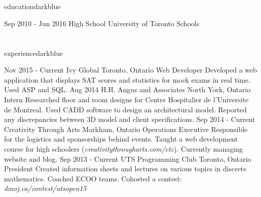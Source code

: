 \documentclass{resume}
\begin{document}
	\begin{main}
		\vspace{10pt}%
		\section{\faBook}{education}{darkblue}
			\begin{entrylist}
				\rightentry%
				{Sep 2010 - Jun 2016}%
				{High School}%
				{University of Toronto Schools}%
				{}{}
			\end{entrylist}
		\section{\faBriefcase}{experience}{darkblue}
			\begin{entrylist}
				\rightentry%
					{Nov 2015 - Current}%
					{Ivy Global}%
					{Toronto, Ontario}%
					{Web Developer}%
					{Developed a web application that displays SAT scores and statistics for mock exams in real time. Used ASP and SQL.}
				\rightentry%
					{Aug 2014}%
					{H.H. Angus and Associates}%
					{North York, Ontario}%
					{Intern}%
					{Researched floor and room designs for Centre Hospitalier de l'Universite de Montreal. Used CADD software to design an architectural model. Reported any discrepancies between 3D model and client specifications.}
				\rightentry%
					{Sep 2014 - Current}%
					{Creativity Through Arts}%
					{Markham, Ontario}%
					{Operations Executive}%
					{Responsible for the logistics and sponsorships behind events. Taught a web development course for high schoolers (\emph{creativitythrougharts.com/ctc}). Currently managing website and blog.}
				\rightentry%
					{Sep 2013 - Current}%
					{UTS Programming Club}%
					{Toronto, Ontario}%
					{President}%
					{Created information sheets and lectures on various topics in discrete mathematics. Coached ECOO teams. Cohosted a contest: \emph{dmoj.ca/contest/utsopen15}}
			\end{entrylist}

\end{main}
\end{document}
